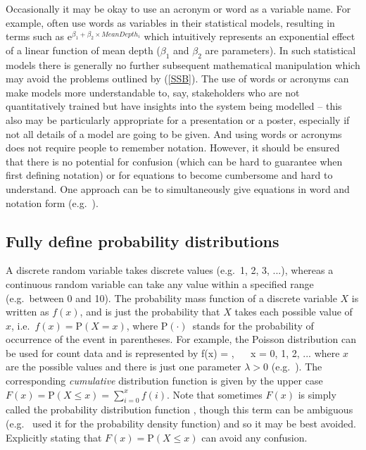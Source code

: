 Occasionally it may be okay to use an acronym or word as a variable name.
For example, \citet{zuur13} often use words
as variables in their statistical models, resulting in terms such as
$\mbox{e}^{\beta_1 + \beta_2 \times MeanDepth_i}$
which intuitively represents an exponential effect of a linear
function of mean depth ($\beta_1$ and $\beta_2$ are parameters).
In such statistical models there is generally no further subsequent mathematical
manipulation which may avoid the problems outlined by (\ref{SSB}).
The use of words or acronyms can make models more understandable to, say,
stakeholders who are not quantitatively trained but
have insights into the system being modelled -- this also may be particularly
appropriate for a presentation or a poster, especially if not all details of
a model are going to be given.
And using words
or acronyms does not require people to remember notation.
However, it should be ensured that
there is no potential for confusion (which can be hard to guarantee when
first defining notation) or for equations to become cumbersome
and hard to understand. One approach can be to simultaneously
give equations in word and notation form (e.g.~\citealt{eb96}).

\subsection*{Fully define probability distributions}

A discrete random variable takes discrete values (e.g.~1, 2, 3, ...), whereas
a continuous random variable can take any value within a specified range
(e.g.~between 0 and 10). The probability mass function of a discrete variable
$X$
is written as $f(x)$, and is just the probability that $X$ takes each possible
value of $x$, i.e.~$f(x) = \mbox{P}(X = x)$, where
P$(\cdot)$~stands for the probability of occurrence of the event in parentheses.
For example, the Poisson distribution can be used for count
data and is represented by
\eb
f(x) = ,
  ~~ x = 0, 1, 2, ...
\label{poisson}
\ee
where $x$ are the possible values and there is just one parameter $\lambda>0$
(e.g.~\citealt{bolk08}). The corresponding \emph{cumulative} distribution
function is given by the upper case
$F(x) = \mbox{P}(X \leq x) = \sum_{i=0}^{x} f(i)$.
Note that sometimes $F(x)$ is simply called the probability distribution
function \citep{gs90}, though this term can be ambiguous (e.g.~\citealt{cw11}
used it for the probability density function) and so it may be best
avoided.
Explicitly stating that
$F(x) = \mbox{P}(X \leq x)$ can avoid any confusion.

